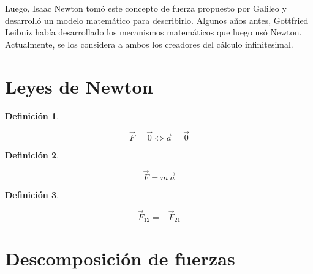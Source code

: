 \documentclass[a5paper,12pt,twoside]{book}
\newtheorem{defn}{{Definición}}[chapter]
\begin{document}
Luego, Isaac Newton tomó este concepto de fuerza propuesto por Galileo y desarrolló un modelo matemático para describirlo.
Algunos años antes, Gottfried Leibniz había desarrollado los mecanismos matemáticos que luego usó Newton.
Actualmente, se los considera a ambos los creadores del cálculo infinitesimal.


\section{Leyes de Newton}

\begin{mdframed}[style=MyFrame1]
    \begin{defn}
        \label{defn:NewtonFirstLaw}
    \end{defn}
    \begin{equation*}
        \Vec{F} = \vec{0} \iff \Vec{a} = \vec{0}
    \end{equation*}
\end{mdframed}

\begin{mdframed}[style=MyFrame1]
    \begin{defn}
        \label{defn:NewtonSecondLaw}
    \end{defn}
    \begin{equation*}
        \Vec{F} = m \, \Vec{a}
    \end{equation*}
\end{mdframed}

\begin{mdframed}[style=MyFrame1]
    \begin{defn}
        \label{defn:NewtonThirdLaw}
    \end{defn}
    \begin{equation*}
        \Vec{F}_{12} = -\Vec{F}_{21}
    \end{equation*}
\end{mdframed}


\section{Descomposición de fuerzas}
\end{document}

